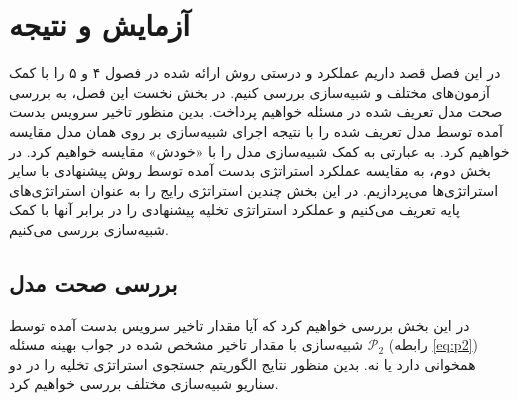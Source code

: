 \chapter{آزمایش و نتیجه}
در این فصل قصد داریم عملکرد و درستی روش ارائه شده در فصول ۴ و ۵ را با کمک آزمون‌های مختلف و شبیه‌سازی بررسی کنیم. در بخش نخست این فصل، به بررسی صحت مدل تعریف شده در مسئله خواهیم پرداخت. بدین منظور تاخیر سرویس بدست آمده توسط مدل تعریف شده را با نتیجه اجرای شبیه‌سازی بر روی همان مدل مقایسه خواهیم کرد. به عبارتی به کمک شبیه‌سازی مدل را با «خودش» مقایسه خواهیم کرد. در بخش دوم، به مقایسه عملکرد استراتژی بدست آمده توسط روش پیشنهادی با سایر استراتژی‌ها می‌پردازیم. در این بخش چندین استراتژی رایج را به عنوان استراتژی‌های پایه تعریف می‌کنیم و عملکرد استراتژی تخلیه پیشنهادی را در برابر آنها با کمک شبیه‌سازی بررسی می‌کنیم.
\section{بررسی صحت مدل}
در این بخش بررسی خواهیم کرد که آیا مقدار تاخیر سرویس بدست آمده توسط شبیه‌سازی با مقدار تاخیر مشخص شده در جواب بهینه مسئله 
$\mathcal{P}_2$
 (رابطه \ref{eq:p2}) همخوانی دارد یا نه. بدین منظور نتایج الگوریتم جستجوی استراتژی تخلیه را در دو سناریو شبیه‌سازی مختلف بررسی خواهیم کرد.
